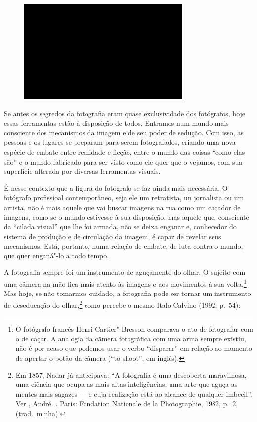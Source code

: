 \begin{figure}[!ht]

\centering
 \includegraphics[width=85mm]{./imgs/im1.jpg}
\caption{\tiny{}}

\end{figure}

Se antes os segredos da fotografia eram quase exclusividade dos fotógrafos, hoje essas ferramentas estão à disposição de todos. Entramos num mundo mais consciente dos mecanismos da imagem e de seu poder de sedução. Com isso, as pessoas e os lugares se preparam para serem fotografados, criando uma nova espécie de embate entre realidade e ficção, entre o mundo das coisas ``como elas são'' e o mundo fabricado para ser visto como ele quer que o vejamos, com sua superfície alterada por diversas ferramentas visuais. 

É nesse contexto que a figura do fotógrafo se faz ainda mais necessária. O fotógrafo profissioal contemporâneo, seja ele um retratista, un jornalista ou um artista, não é mais aquele que vai buscar imagens na rua como um caçador de imagens, como se o mundo estivesse à sua disposição, mas aquele que, consciente da ``cilada visual'' que lhe foi armada, não se deixa enganar e, conhecedor do sistema de produção e de circulação da imagem, é capaz de revelar seus mecanismos. Está, portanto, numa relação de embate, de luta contra o mundo, que quer enganá"-lo a todo tempo.

A fotografia sempre foi um instrumento de aguçamento do olhar. O sujeito
com uma câmera na mão fica mais atento às imagens e aos movimentos à sua
volta.\footnote{O fotógrafo francês Henri Cartier"-Bresson comparava o
  ato de fotografar com o de caçar. A analogia da câmera fotográfica com
  uma arma sempre existiu, não é por acaso que podemos usar o verbo
  ``disparar'' em relação ao momento de apertar o botão da câmera (``to
  shoot'', em inglês).} Mas hoje, se não tomarmos cuidado, a fotografia
pode ser tornar um instrumento de deseducação do olhar,\footnote{Em
  1857, Nadar já antecipava: ``A fotografia é uma descoberta
  maravilhosa, uma ciência que ocupa as mais altas inteligências, uma
  arte que aguça as mentes mais sagazes --- e cuja realização está ao
  alcance de qualquer imbecil''. Ver , André. {}.
  Paris: Fondation Nationale de la Photographie, 1982, p.~2, (trad.~minha).} como percebe o mesmo Italo Calvino (1992, p.~54):

